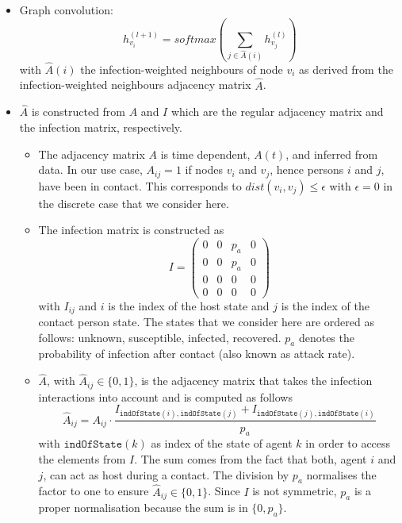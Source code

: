 \documentclass[]{article}
\newcommand{\indexOfState}[1]{\texttt{indOfState}(#1)}
\begin{document}
\begin{itemize}
	\item Graph convolution:
	\begin{equation}
		h_{v_i}^{(l+1)} = softmax(\sum_{j\in \hat{A}(i)} h_{v_j}^{(l)})
	\end{equation}
	with $\hat{A}(i)$ the infection-weighted neighbours of node $v_i$ as derived from the infection-weighted neighbours adjacency matrix $\hat{A}$.
	\item $\hat{A}$ is constructed from $A$ and $I$ which are the regular adjacency matrix and the infection matrix, respectively.
	\begin{itemize}
		\item The adjacency matrix $A$ is time dependent, $A(t)$, and inferred from data. In our use case, $A_{ij}=1$ if nodes $v_i$ and $v_j$, hence persons $i$ and $j$, have been in contact. This corresponds to $dist(v_i, v_j) \le \epsilon$ with $\epsilon=0$ in the discrete case that we consider here.
		\item The infection matrix is constructed as
		\begin{equation}
			I =
			\begin{pmatrix}
				0 & 0 & p_a & 0 \\
				0 & 0 & p_a & 0 \\
				0 & 0 &  0  & 0 \\
				0 & 0 &  0  & 0
			\end{pmatrix}
		\end{equation}
		with $I_{ij}$ and $i$ is the index of the host state and $j$ is the index of the contact person state. The states that we consider here are ordered as follows: unknown, susceptible, infected, recovered. $p_a$ denotes the probability of infection  after contact (also known as attack rate).
		\item $\hat{A}$, with $\hat{A}_{ij}\in \{0, 1\}$, is the adjacency matrix that takes the infection interactions into account and is computed as follows
		\begin{equation}
			\hat{A}_{ij} = A_{ij}\cdot \frac{I_{\indexOfState{i}, \indexOfState{j}} + I_{\indexOfState{j}, \indexOfState{i}}}{p_a}
		\end{equation}
		with $\indexOfState{k}$ as index of the state of agent $k$ in order to access the elements from $I$. The sum comes from the fact that both, agent $i$ and $j$, can act as host during a contact. The division by $p_a$ normalises the factor to one to ensure $\hat{A}_{ij} \in \{0, 1\}$. Since $I$ is not symmetric, $p_a$ is a proper normalisation because the sum is in $\{0, p_a\}$.

\end{itemize}
\end{itemize}
\end{document}
